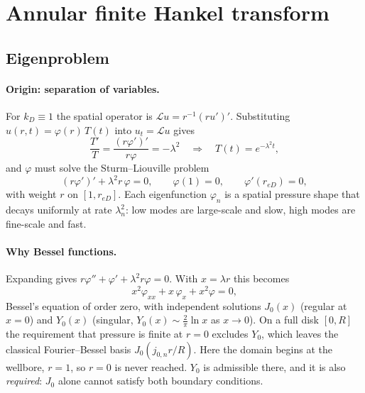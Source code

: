 \documentclass[11pt]{article}
\newcommand{\reD}{r_{eD}}
\begin{document}
\section{Annular finite Hankel transform}

\subsection{Eigenproblem}

\paragraph{Origin: separation of variables.}
For $k_D\equiv 1$ the spatial operator is $\mathcal{L}u = r^{-1}(r u')'$. Substituting $u(r,t)=\varphi(r)\,T(t)$ into
$u_t=\mathcal{L}u$ gives
\begin{equation}
  \frac{T'}{T} = \frac{(r\varphi')'}{r\varphi} = -\lambda^2
  \quad\Longrightarrow\quad T(t)=e^{-\lambda^2 t},
\end{equation}
and $\varphi$ must solve the Sturm--Liouville problem
\begin{equation}
  (r\varphi')' + \lambda^2 r\,\varphi = 0,\qquad \varphi(1)=0,\qquad \varphi'(\reD)=0,
\end{equation}
with weight $r$ on $[1,\reD]$. Each eigenfunction $\varphi_n$ is a spatial pressure shape that decays uniformly
at rate $\lambda_n^2$: low modes are large-scale and slow, high modes are fine-scale and fast.

\paragraph{Why Bessel functions.}
Expanding gives $r\varphi''+\varphi'+\lambda^2 r\varphi=0$. With $x=\lambda r$ this becomes
\begin{equation}
  x^2\varphi_{xx} + x\,\varphi_x + x^2\varphi = 0,
\end{equation}
Bessel's equation of order zero, with independent solutions $J_0(x)$ (regular at $x=0$) and $Y_0(x)$
(singular, $Y_0(x)\sim\frac{2}{\pi}\ln x$ as $x\to0$). On a full disk $[0,R]$ the requirement that pressure is finite
at $r=0$ excludes $Y_0$, which leaves the classical Fourier--Bessel basis $J_0(j_{0,n}r/R)$. Here the domain begins at
the wellbore, $r=1$, so $r=0$ is never reached. $Y_0$ is admissible there, and it is also \emph{required}:
$J_0$ alone cannot satisfy both boundary conditions.
\end{document}
